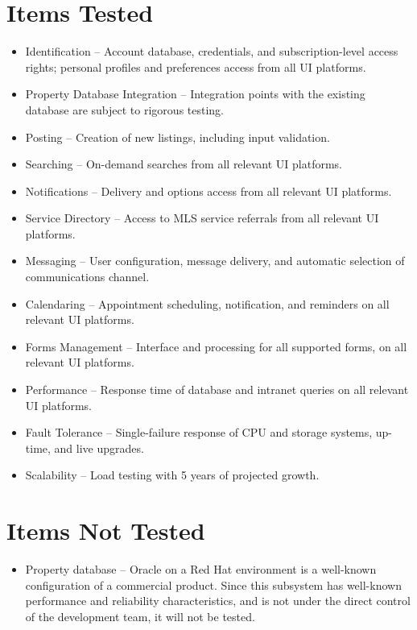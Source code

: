\documentclass[11pt]{wacomepd}
\begin{document}
\section {Items Tested}
\begin{itemize}
\item Identification -- Account database, credentials, and subscription-level access rights;
  personal profiles and preferences access from all UI platforms.
\item Property Database Integration -- Integration points with the existing database are subject to
  rigorous testing.
\item Posting -- Creation of new listings, including input validation.
\item Searching -- On-demand searches from all relevant UI platforms.
\item Notifications -- Delivery and options access from all relevant UI platforms.
\item Service Directory -- Access to MLS service referrals from all relevant UI platforms.
\item Messaging -- User configuration, message delivery, and automatic selection of communications
  channel.
\item Calendaring -- Appointment scheduling, notification, and reminders on all relevant UI
  platforms.
\item Forms Management -- Interface and processing for all supported forms, on all relevant UI
  platforms.
\item Performance -- Response time of database and intranet queries on all relevant UI platforms.
\item Fault Tolerance -- Single-failure response of CPU and storage systems, up-time, and live
  upgrades.
\item Scalability -- Load testing with 5 years of projected growth.
\end{itemize}

\section {Items Not Tested}
\begin{itemize}
\item Property database -- Oracle on a Red Hat environment is a well-known configuration of a
  commercial product.  Since this subsystem has well-known performance and reliability
  characteristics, and is not under the direct control of the development team, it will not be
  tested.
\end{itemize}
\end{document}

